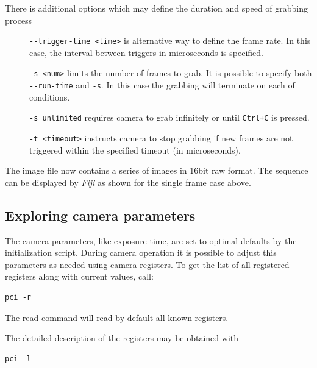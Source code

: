 There is additional options which may define the duration and speed of grabbing process
\begin{description}
\item[ ] \verb/--trigger-time <time>/ is alternative way to define the frame rate. In this case, the interval between triggers in microseconds is specified.
\item[ ] \verb/-s <num>/ limits the number of frames to grab. It is possible to specify both \verb/--run-time/ and \verb/-s/. In this case the grabbing will terminate on each of conditions.
\item[ ] \verb/-s unlimited/ requires camera to grab infinitely or until \verb/Ctrl+C/ is pressed.
\item[ ] \verb/-t <timeout>/ instructs camera to stop grabbing if new frames are not triggered within the specified timeout (in microseconds).
\end{description}


The image file now contains a series of images in 16bit raw format. The sequence can be displayed by \emph{Fiji} as shown for the single frame case above.



\subsection{Exploring camera parameters}

The camera parameters, like exposure time, are set to optimal defaults by the initialization script. During camera operation it is possible to adjust this parameters as needed using camera registers. To get the list of all registered registers along with current values, call:
\begin{verbatim}
pci -r 
\end{verbatim}
The read command will read by default all known registers.


The detailed description of the registers may be obtained with
\begin{verbatim}
pci -l
\end{verbatim}

